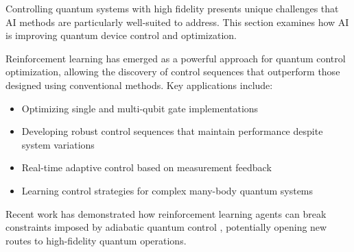 Controlling quantum systems with high fidelity presents unique challenges that AI methods are particularly well-suited to address. This section examines how AI is improving quantum device control and optimization.

Reinforcement learning has emerged as a powerful approach for quantum control optimization, allowing the discovery of control sequences that outperform those designed using conventional methods. Key applications include:

\begin{itemize}
    \item Optimizing single and multi-qubit gate implementations
    \item Developing robust control sequences that maintain performance despite system variations
    \item Real-time adaptive control based on measurement feedback
    \item Learning control strategies for complex many-body quantum systems
\end{itemize}

Recent work has demonstrated how reinforcement learning agents can break constraints imposed by adiabatic quantum control \cite{ding2021breaking}, potentially opening new routes to high-fidelity quantum operations. 
